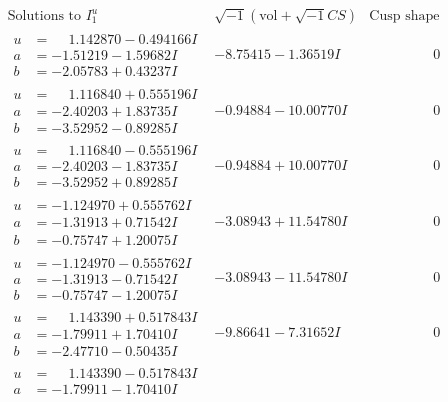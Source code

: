 \documentclass[1p]{elsarticle_modified}
\theoremstyle{definition}
\newcommand{\I}{\sqrt{-1}}
\begin{document}
$$\begin{array}{c|c|c}
\text{Solutions to }I^u_{1}& \I (\text{vol} + \sqrt{-1}CS) & \text{Cusp shape}\\
 \hline 
\begin{aligned}
u &= \phantom{-}1.142870 - 0.494166 I \\
a &= -1.51219 - 1.59682 I \\
b &= -2.05783 + 0.43237 I\end{aligned}
 & -8.75415 - 1.36519 I & \phantom{-0.000000 } 0 \\ \hline\begin{aligned}
u &= \phantom{-}1.116840 + 0.555196 I \\
a &= -2.40203 + 1.83735 I \\
b &= -3.52952 - 0.89285 I\end{aligned}
 & -0.94884 - 10.00770 I & \phantom{-0.000000 } 0 \\ \hline\begin{aligned}
u &= \phantom{-}1.116840 - 0.555196 I \\
a &= -2.40203 - 1.83735 I \\
b &= -3.52952 + 0.89285 I\end{aligned}
 & -0.94884 + 10.00770 I & \phantom{-0.000000 } 0 \\ \hline\begin{aligned}
u &= -1.124970 + 0.555762 I \\
a &= -1.31913 + 0.71542 I \\
b &= -0.75747 + 1.20075 I\end{aligned}
 & -3.08943 + 11.54780 I & \phantom{-0.000000 } 0 \\ \hline\begin{aligned}
u &= -1.124970 - 0.555762 I \\
a &= -1.31913 - 0.71542 I \\
b &= -0.75747 - 1.20075 I\end{aligned}
 & -3.08943 - 11.54780 I & \phantom{-0.000000 } 0 \\ \hline\begin{aligned}
u &= \phantom{-}1.143390 + 0.517843 I \\
a &= -1.79911 + 1.70410 I \\
b &= -2.47710 - 0.50435 I\end{aligned}
 & -9.86641 - 7.31652 I & \phantom{-0.000000 } 0 \\ \hline\begin{aligned}
u &= \phantom{-}1.143390 - 0.517843 I \\
a &= -1.79911 - 1.70410 I \\

\end{aligned}
\end{array}$$
\end{document}
